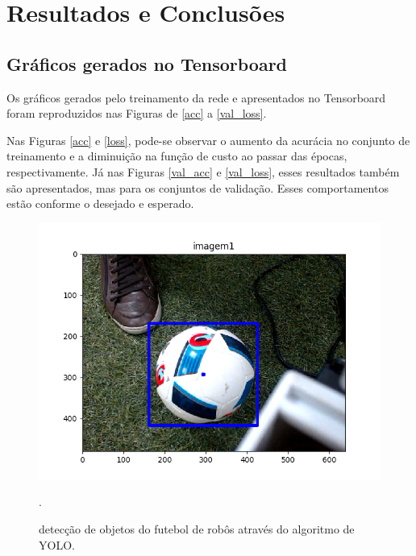 \documentclass[conference]{IEEEtran}
\begin{document}
\section{Resultados e Conclusões}

\subsection{Gráficos gerados no Tensorboard}
Os gráficos gerados pelo treinamento da rede e apresentados no Tensorboard foram reproduzidos nas Figuras de \ref{acc} a \ref{val_loss}.

Nas Figuras \ref{acc} e \ref{loss}, pode-se observar o aumento da acurácia no conjunto de treinamento e a diminuição na função de custo ao passar das épocas, respectivamente. Já nas Figuras \ref{val_acc} e \ref{val_loss}, esses resultados também são apresentados, mas para os conjuntos de validação. Esses comportamentos estão conforme o desejado e esperado.

\begin{figure}[htbp]
\centering
\centerline{\includegraphics[scale=0.5]{imagens/imagem1_detection.png}}
\caption{detecção de objetos do futebol de robôs através do algoritmo de YOLO.}.
\label{imagem1_detection}
\end{figure}
\end{document}

